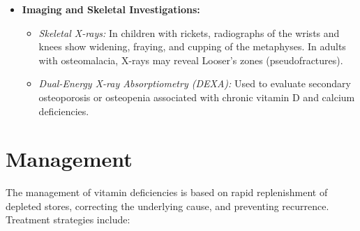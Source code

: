 \begin{itemize}
    \item \textbf{Imaging and Skeletal Investigations:}
    \begin{itemize}
        \item \textit{Skeletal X-rays:} In children with rickets, radiographs of the wrists and knees show widening, fraying, and cupping of the metaphyses. In adults with osteomalacia, X-rays may reveal Looser's zones (pseudofractures).
        \item \textit{Dual-Energy X-ray Absorptiometry (DEXA):} Used to evaluate secondary osteoporosis or osteopenia associated with chronic vitamin D and calcium deficiencies.
    \end{itemize}
\end{itemize}

\section*{Management}
The management of vitamin deficiencies is based on rapid replenishment of depleted stores, correcting the underlying cause, and preventing recurrence. Treatment strategies include:


